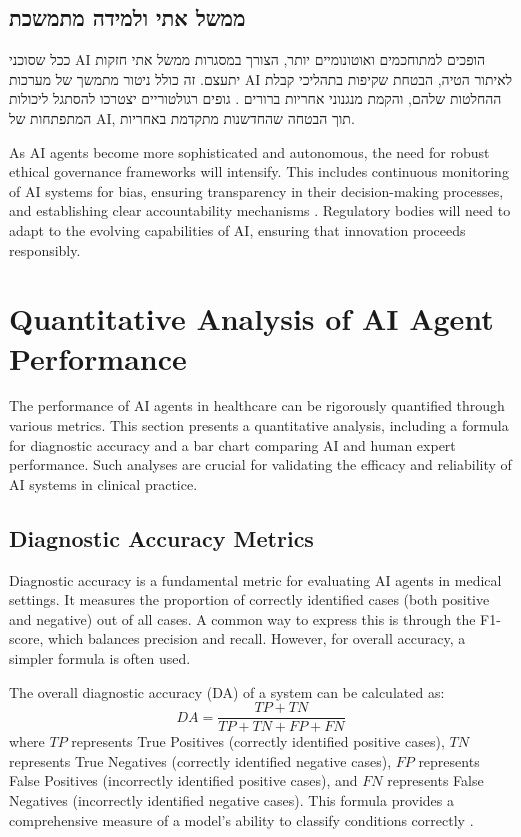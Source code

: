 \documentclass[12pt,a4paper]{article}
\newenvironment{hebrewblock}{%
  \begin{tcolorbox}[enhanced,breakable,title={\hebrewfont עברית},
    colback=blue!3!white,colframe=blue!35!white,fonttitle=\bfseries,
    attach boxed title to top right={yshift=-2.5mm,xshift=-4mm},
    boxed title style={colback=blue!35!white,sharp corners}]
  \begin{hebrew}
}{%
  \end{hebrew}\end{tcolorbox}\medskip
}
\newenvironment{englishblock}{%
  \begin{tcolorbox}[enhanced,breakable,title={English Translation},
    colback=gray!4!white,colframe=gray!40!white,fonttitle=\bfseries]
}{%
  \end{tcolorbox}\medskip
}
\begin{document}
\subsection{\texthebrew{ממשל אתי ולמידה מתמשכת}}
\begin{hebrewblock}
ככל שסוכני AI הופכים למתוחכמים ואוטונומיים יותר, הצורך במסגרות ממשל אתי חזקות יתעצם. זה כולל ניטור מתמשך של מערכות AI לאיתור הטיה, הבטחת שקיפות בתהליכי קבלת ההחלטות שלהם, והקמת מנגנוני אחריות ברורים \cite{omnicuris.com}. גופים רגולטוריים יצטרכו להסתגל ליכולות המתפתחות של AI, תוך הבטחה שהחדשנות מתקדמת באחריות.
\end{hebrewblock}
\begin{englishblock}
As AI agents become more sophisticated and autonomous, the need for robust ethical governance frameworks will intensify. This includes continuous monitoring of AI systems for bias, ensuring transparency in their decision-making processes, and establishing clear accountability mechanisms \cite{omnicuris.com}. Regulatory bodies will need to adapt to the evolving capabilities of AI, ensuring that innovation proceeds responsibly.
\end{englishblock}

\section{Quantitative Analysis of AI Agent Performance}
The performance of AI agents in healthcare can be rigorously quantified through various metrics. This section presents a quantitative analysis, including a formula for diagnostic accuracy and a bar chart comparing AI and human expert performance. Such analyses are crucial for validating the efficacy and reliability of AI systems in clinical practice.

\subsection{Diagnostic Accuracy Metrics}
Diagnostic accuracy is a fundamental metric for evaluating AI agents in medical settings. It measures the proportion of correctly identified cases (both positive and negative) out of all cases. A common way to express this is through the F1-score, which balances precision and recall. However, for overall accuracy, a simpler formula is often used.

The overall diagnostic accuracy (DA) of a system can be calculated as:
\begin{equation}
\label{eq:diagnostic_accuracy}
DA = \frac{TP + TN}{TP + TN + FP + FN}
\end{equation}
where $TP$ represents True Positives (correctly identified positive cases), $TN$ represents True Negatives (correctly identified negative cases), $FP$ represents False Positives (incorrectly identified positive cases), and $FN$ represents False Negatives (incorrectly identified negative cases). This formula provides a comprehensive measure of a model's ability to classify conditions correctly \cite{fleming2018artificial}.
\end{document}
